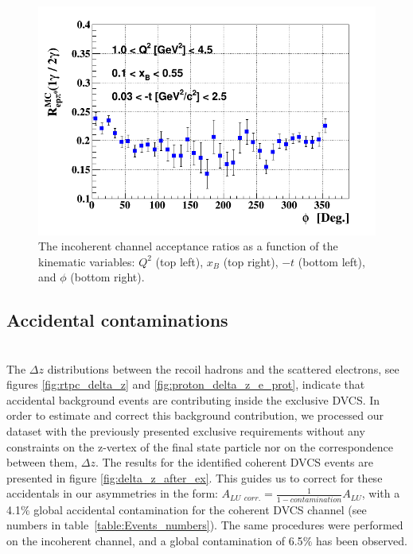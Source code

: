\begin{figure}[tp]
\includegraphics[scale=0.30]{fig_dvcs/epgamma_eppi0_Phi.png}
\caption{The incoherent channel acceptance ratios as a function of the kinematic variables: $Q^{2}$ (top left), $x_{B}$ (top right), $-t$ (bottom left), and $\phi$ (bottom right).  }
\label{fig:incoh_acceptance _ratios}
\end{figure}

\subsection{Accidental contaminations}
~\\

The $\Delta z$ distributions between the recoil hadrons and the scattered 
electrons, see figures \ref{fig:rtpc_delta_z} and 
\ref{fig:proton_delta_z_e_prot}, indicate that accidental background events are 
contributing inside the exclusive DVCS. In order to estimate and correct 
this background contribution, we processed our dataset with the previously 
presented exclusive requirements without any constraints on the z-vertex of the 
final state particle nor on the correspondence between them, $\Delta z$. The 
results for the identified coherent DVCS events are presented in figure 
\ref{fig:delta_z_after_ex}. This guides us to correct for these accidentals in 
our asymmetries in the form: $ A_{LU~~corr.} = \frac{1}{1 - contamination} 
A_{LU}$, with a 4.1$\%$ global accidental contamination for the coherent DVCS 
channel (see numbers in table~\ref{table:Events_numbers}). The same procedures 
were performed on the incoherent channel, and a 
global contamination of 6.5$\%$ has been observed.\\

